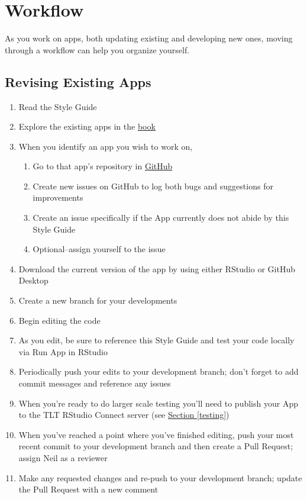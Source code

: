 \documentclass[
]{book}
\providecommand{\tightlist}{%
  \setlength{\itemsep}{0pt}\setlength{\parskip}{0pt}}
\begin{document}
\hypertarget{workflow}{%
\chapter{Workflow}\label{workflow}}

As you work on apps, both updating existing and developing new ones, moving through a workflow can help you organize yourself.

\hypertarget{revising-existing-apps}{%
\section{Revising Existing Apps}\label{revising-existing-apps}}

\begin{enumerate}
\def\labelenumi{\arabic{enumi}.}
\tightlist
\item
  Read the Style Guide
\item
  Explore the existing apps in the \href{https://sites.psu.edu/shinyapps/}{book}
\item
  When you identify an app you wish to work on,

  \begin{enumerate}
  \def\labelenumii{\alph{enumii}.}
  \tightlist
  \item
    Go to that app's repository in \href{https://github.com/EducationShinyAppTeam}{GitHub}
  \item
    Create new issues on GitHub to log both bugs and suggestions for improvements
  \item
    Create an issue specifically if the App currently does not abide by this Style Guide
  \item
    Optional--assign yourself to the issue
  \end{enumerate}
\item
  Download the current version of the app by using either RStudio or GitHub Desktop
\item
  Create a new branch for your developments
\item
  Begin editing the code
\item
  As you edit, be sure to reference this Style Guide and test your code locally via Run App in RStudio
\item
  Periodically push your edits to your development branch; don't forget to add commit messages and reference any issues
\item
  When you're ready to do larger scale testing you'll need to publish your App to the TLT RStudio Connect server (see \protect\hyperlink{testing}{Section \ref{testing}})
\item
  When you've reached a point where you've finished editing, push your most recent commit to your development branch and then create a Pull Request; assign Neil as a reviewer
\item
  Make any requested changes and re-push to your development branch; update the Pull Request with a new comment
\end{enumerate}
\end{document}

